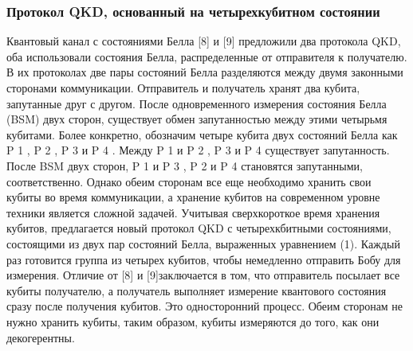 \subsubsection{Протокол QKD, основанный на четырехкубитном состоянии}

Квантовый канал с состояниями Белла [8] и [9] предложили два протокола QKD, оба использовали состояния Белла, распределенные от отправителя к получателю. В их протоколах две пары состояний Белла разделяются между двумя законными сторонами коммуникации. Отправитель и получатель хранят два кубита, запутанные друг с другом. После одновременного измерения состояния Белла (BSM) двух сторон, существует обмен запутанностью между этими четырьмя кубитами.
Более конкретно, обозначим четыре кубита двух состояний Белла как P 1 , P 2 , P 3 и P 4 . Между P 1 и P 2 , P 3 и P 4 существует запутанность. После BSM двух сторон, P 1 и P 3 , P 2 и P 4 становятся запутанными, соответственно. Однако обеим сторонам все еще необходимо хранить свои кубиты во время коммуникации, а хранение кубитов на современном уровне техники является сложной задачей.
Учитывая сверхкороткое время хранения кубитов, предлагается новый протокол QKD с четырехкбитными состояниями, состоящими из двух пар состояний Белла, выраженных уравнением (1). Каждый раз готовится группа из четырех кубитов, чтобы немедленно отправить Бобу для измерения. Отличие от [8] и [9]заключается в том, что отправитель посылает все кубиты получателю, а получатель выполняет измерение квантового состояния сразу после получения кубитов. Это односторонний процесс. Обеим сторонам не нужно хранить кубиты, таким образом, кубиты измеряются до того, как они декогерентны.

